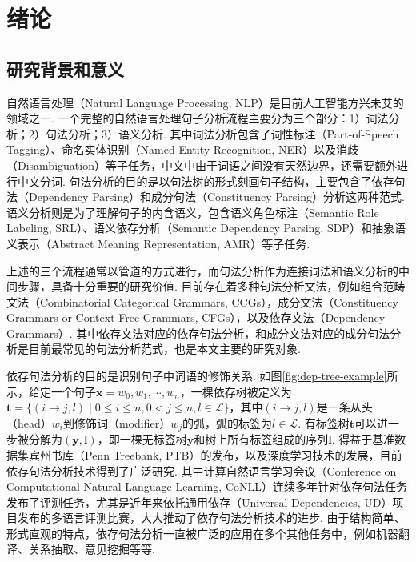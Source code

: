\chapter{绪论}
\label{cha:intro}

\section{研究背景和意义}

自然语言处理（Natural Language Processing, NLP）是目前人工智能方兴未艾的领域之一.
一个完整的自然语言处理句子分析流程主要分为三个部分：1）词法分析；2）句法分析；3）语义分析.
其中词法分析包含了词性标注（Part-of-Speech Tagging）、命名实体识别（Named Entity Recognition, NER）以及消歧（Disambiguation）等子任务，中文中由于词语之间没有天然边界，还需要额外进行中文分词.
句法分析的目的是以句法树的形式刻画句子结构，主要包含了依存句法（Dependency Parsing）和成分句法（Constituency Parsing）分析这两种范式.
语义分析则是为了理解句子的内含语义，包含语义角色标注（Semantic Role Labeling, SRL）、语义依存分析（Semantic Dependency Parsing, SDP）和抽象语义表示（Abstract Meaning Representation, AMR）等子任务.

上述的三个流程通常以管道的方式进行，而句法分析作为连接词法和语义分析的中间步骤，具备十分重要的研究价值.
目前存在着多种句法分析文法，例如组合范畴文法（Combinatorial Categorical Grammars, CCGs），成分文法（Constituency Grammars or Context Free Grammars, CFGs），以及依存文法（Dependency Grammars）.
其中依存文法对应的依存句法分析，和成分文法对应的成分句法分析是目前最常见的句法分析范式，也是本文主要的研究对象.


依存句法分析的目的是识别句子中词语的修饰关系.
如图\ref{fig:dep-tree-example}所示，给定一个句子$\boldsymbol{x}=w_0,w_1,\cdots,w_n$，一棵依存树被定义为$\boldsymbol{t}=\{(i\rightarrow j,l)\mid 0\le i \le n,0 < j \le n,l \in \mathcal{L}\}$，其中$(i\rightarrow j,l)$是一条从头（head）$w_i$到修饰词（modifier）$w_j$的弧，弧的标签为$l \in \mathcal{L}$.
有标签树$\boldsymbol{t}$可以进一步被分解为$(\boldsymbol{y},\boldsymbol{l})$，即一棵无标签树$\boldsymbol{y}$和树上所有标签组成的序列$\boldsymbol{l}$.
得益于基准数据集宾州书库（Penn Treebank, PTB）的发布，以及深度学习技术的发展，目前依存句法分析技术得到了广泛研究.
其中计算自然语言学习会议（Conference on Computational Natural Language Learning, CoNLL）连续多年针对依存句法任务发布了评测任务，尤其是近年来依托通用依存（Universal Dependencies, UD）\citep{nivre-etal-2017-universal}项目发布的多语言评测比赛，大大推动了依存句法分析技术的进步.
由于结构简单、形式直观的特点，依存句法分析一直被广泛的应用在多个其他任务中，例如机器翻译\citep{zhang-etal-2019-syntax}、关系抽取\citep{song-etal-2019-leveraging}、意见挖掘\citep{zhang-etal-2020-syntax}等等.

